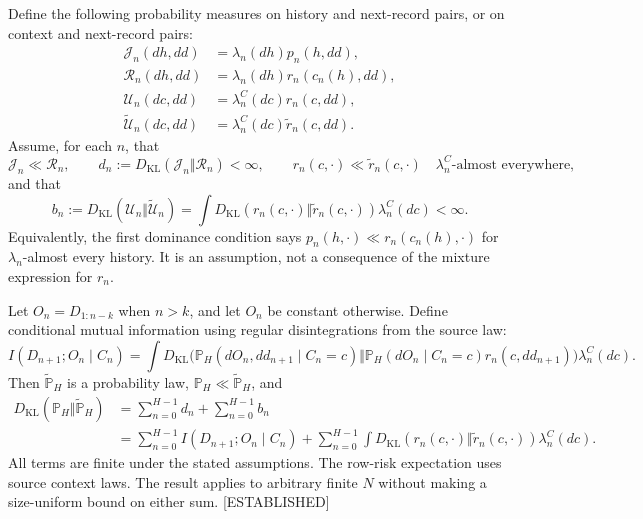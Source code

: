\documentclass[11pt,letterpaper]{report}
\newcommand{\KL}{D_{\mathrm{KL}}}
\newcommand{\status}[1]{\mbox{{\small\textsc{\textcolor{red!45!black}{[#1]}}}}}
\begin{document}
Define the following probability measures on history and next-record pairs, or on context and next-record pairs:
\begin{align*}
 \mathcal J_n(dh,dd)&=\lambda_n(dh)p_n(h,dd),\\
 \mathcal R_n(dh,dd)&=\lambda_n(dh)r_n(c_n(h),dd),\\
 \mathcal U_n(dc,dd)&=\lambda_n^C(dc)r_n(c,dd),\\
 \widetilde{\mathcal U}_n(dc,dd)
     &=\lambda_n^C(dc)\widetilde r_n(c,dd).
\end{align*}
Assume, for each $n$, that
\[
 \mathcal J_n\ll\mathcal R_n,
 \qquad d_n:=\KL(\mathcal J_n\Vert\mathcal R_n)<\infty,
 \qquad
 r_n(c,\cdot)\ll\widetilde r_n(c,\cdot)
       \quad\lambda_n^C\text{-almost everywhere},
\]
and that
\[
 b_n:=\KL(\mathcal U_n\Vert\widetilde{\mathcal U}_n)
  =\int\KL(r_n(c,\cdot)\Vert\widetilde r_n(c,\cdot))
                        \lambda_n^C(dc)<\infty.
\]
Equivalently, the first dominance condition says
$p_n(h,\cdot)\ll r_n(c_n(h),\cdot)$ for $\lambda_n$-almost every history. It is an assumption, not a consequence of the mixture expression for $r_n$.

Let $O_n=D_{1:n-k}$ when $n>k$, and let $O_n$ be constant otherwise. Define conditional mutual information using regular disintegrations from the source law:
\[
 I(D_{n+1};O_n\mid C_n)
  =\int\KL\bigl(
       \mathbb P_H(dO_n,dd_{n+1}\mid C_n=c)
       \Vert
       \mathbb P_H(dO_n\mid C_n=c)r_n(c,dd_{n+1})
                  \bigr)\lambda_n^C(dc).
\]
Then $\widetilde{\mathbb P}_H$ is a probability law,
$\mathbb P_H\ll\widetilde{\mathbb P}_H$, and
\begin{align}
 \KL(\mathbb P_H\Vert\widetilde{\mathbb P}_H)
 &=\sum_{n=0}^{H-1}d_n+\sum_{n=0}^{H-1}b_n\\
 &=\sum_{n=0}^{H-1}I(D_{n+1};O_n\mid C_n)
  +\sum_{n=0}^{H-1}\int
       \KL(r_n(c,\cdot)\Vert\widetilde r_n(c,\cdot))
                                  \lambda_n^C(dc).
 \label{eq:sf-boundary-borel-budget}
\end{align}
All terms are finite under the stated assumptions. The row-risk expectation uses source context laws. The result applies to arbitrary finite $N$ without making a size-uniform bound on either sum. \status{ESTABLISHED}
\end{document}
